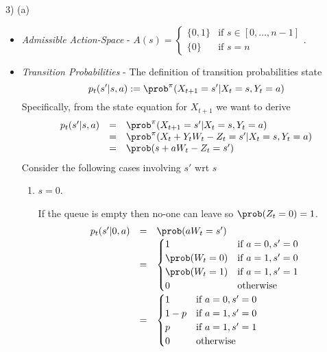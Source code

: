 \documentclass[11pt,a4paper]{article}
\begin{document}
\begin{answer}{3) (a)}
\begin{itemize}
    \item \textit{Admissible Action-Space} - $A(s)=\begin{cases}\{0,1\}&\text{if }s\in[0,\dots,n-1]\\\{0\}&\text{if }s=n\end{cases}$.

    \item \textit{Transition Probabilities} - The definition of transition probabilities state
    \[ p_t(s'|s,a):=\prob^\pi(X_{t+1}=s'|X_t=s,Y_t=a) \]
    Specifically, from the state equation for $X_{t+1}$ we want to derive
    \[\begin{array}{rcl}
      p_t(s'|s,a)&=&\prob^\pi(X_{t+1}=s'|X_t=s,Y_t=a)\\
      &=&\prob^\pi(X_t+Y_tW_t-Z_t=s'|X_t=s,Y_t=a)\\
      &=&\prob(s+aW_t-Z_t=s')\\
    \end{array}\]
    Consider the following cases involving $s'$ wrt $s$
    \begin{enumerate}

      \item $s=0$.
      \par If the queue is empty then no-one can leave so $\prob(Z_t=0)=1$.
      \[\begin{array}{rcl}
        p_t(s'|0,a)&=&\prob(aW_t=s')\\
                   &=& \begin{cases}
                         1&\text{if }a=0,s'=0\\
                         \prob(W_t=0)&\text{if }a=1,s'=0\\
                         \prob(W_t=1)&\text{if }a=1,s'=1\\
                         0&\text{otherwise}
                       \end{cases}\\
                   &=& \begin{cases}
                         1&\text{if }a=0,s'=0\\
                         1-p&\text{if }a=1,s'=0\\
                         p&\text{if }a=1,s'=1\\
                         0&\text{otherwise}
                       \end{cases}\\
      \end{array}\]


\end{enumerate}
\end{itemize}
\end{answer}
\end{document}
